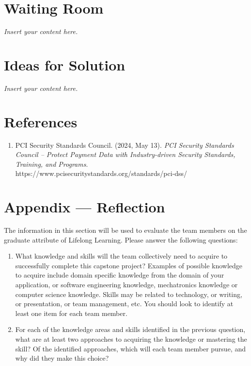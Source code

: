 \documentclass[12pt]{article}
\newcommand{\lips}{\textit{Insert your content here.}}
\begin{document}
\section{Waiting Room}
\lips

\section{Ideas for Solution}
\lips

\newpage{}
\section*{References}
\begin{enumerate}
    \item PCI Security Standards Council. (2024, May 13). \textit{PCI Security Standards Council – Protect Payment Data with Industry-driven Security Standards, Training, and Programs}. https://www.pcisecuritystandards.org/standards/pci-dss/
\end{enumerate}

\newpage{}
\section*{Appendix --- Reflection}

The information in this section will be used to evaluate the team members on the
graduate attribute of Lifelong Learning.  Please answer the following questions:

\begin{enumerate}
  \item What knowledge and skills will the team collectively need to acquire to
  successfully complete this capstone project?  Examples of possible knowledge
  to acquire include domain specific knowledge from the domain of your
  application, or software engineering knowledge, mechatronics knowledge or
  computer science knowledge.  Skills may be related to technology, or writing,
  or presentation, or team management, etc.  You should look to identify at
  least one item for each team member.
  \item For each of the knowledge areas and skills identified in the previous
  question, what are at least two approaches to acquiring the knowledge or
  mastering the skill?  Of the identified approaches, which will each team
  member pursue, and why did they make this choice?
\end{enumerate}
\end{document}
